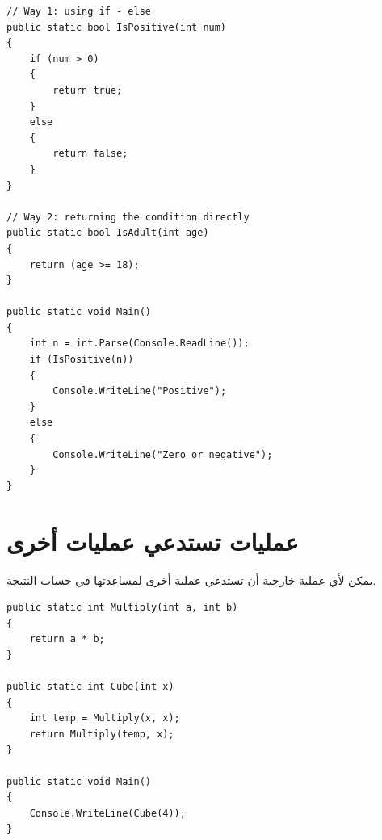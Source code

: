 \documentclass[14pt]{extarticle}
\begin{document}
\begin{boxExample}
\begin{english}
\begin{verbatim}
// Way 1: using if - else
public static bool IsPositive(int num)
{
    if (num > 0)
    {
        return true;
    }
    else
    {
        return false;
    }
}

// Way 2: returning the condition directly
public static bool IsAdult(int age)
{
    return (age >= 18);
}

public static void Main()
{
    int n = int.Parse(Console.ReadLine());
    if (IsPositive(n))
    {
        Console.WriteLine("Positive");
    }
    else
    {
        Console.WriteLine("Zero or negative");
    }
}
\end{verbatim}
\end{english}
\end{boxExample}

\filbreak
\section{عمليات تستدعي عمليات أخرى}
يمكن لأي عملية خارجية أن تستدعي عملية أخرى لمساعدتها في حساب النتيجة.

\begin{boxExample}
\begin{english}
\begin{verbatim}
public static int Multiply(int a, int b)
{
    return a * b;
}

public static int Cube(int x)
{
    int temp = Multiply(x, x);
    return Multiply(temp, x);
}

public static void Main()
{
    Console.WriteLine(Cube(4));
}
\end{verbatim}
\end{english}
\end{boxExample}

\filbreak
\end{document}
